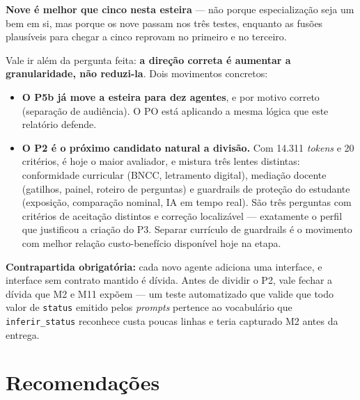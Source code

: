 \documentclass[11pt,a4paper]{article}
\newcommand{\cod}[1]{\texttt{\small #1}}
\begin{document}
\textbf{Nove é melhor que cinco nesta esteira} --- não porque especialização seja um bem em si, mas porque
os nove passam nos três testes, enquanto as fusões plausíveis para chegar a cinco reprovam no primeiro e no
terceiro.

Vale ir além da pergunta feita: \textbf{a direção correta é aumentar a granularidade, não reduzi-la}. Dois
movimentos concretos:

\begin{itemize}[leftmargin=*,itemsep=2pt]
  \item \textbf{O P5b já move a esteira para dez agentes}, e por motivo correto (separação de audiência).
  O PO está aplicando a mesma lógica que este relatório defende.
  \item \textbf{O P2 é o próximo candidato natural a divisão.} Com 14.311 \textit{tokens} e 20 critérios, é
  hoje o maior avaliador, e mistura três lentes distintas: conformidade curricular (BNCC, letramento
  digital), mediação docente (gatilhos, painel, roteiro de perguntas) e guardrails de proteção do estudante
  (exposição, comparação nominal, IA em tempo real). São três perguntas com critérios de aceitação distintos
  e correção localizável --- exatamente o perfil que justificou a criação do P3. Separar currículo de
  guardrails é o movimento com melhor relação custo-benefício disponível hoje na etapa.
\end{itemize}

\noindent
\textbf{Contrapartida obrigatória:} cada novo agente adiciona uma interface, e interface sem contrato
mantido é dívida. Antes de dividir o P2, vale fechar a dívida que M2 e M11 expõem --- um teste automatizado
que valide que todo valor de \cod{status} emitido pelos \textit{prompts} pertence ao vocabulário que
\cod{inferir\_status} reconhece custa poucas linhas e teria capturado M2 antes da entrega.

\newpage
\section{Recomendações}
\label{sec:recomendacoes}
\end{document}

